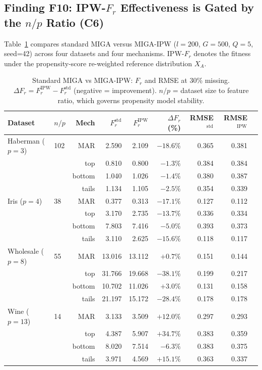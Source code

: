 \subsection{Finding F10: IPW-$F_r$ Effectiveness is Gated by the $n/p$ Ratio (C6)}

Table~\ref{tab:ipw} compares standard MIGA versus MIGA-IPW ($l=200$, $G=500$, $Q=5$, seed=42) across four datasets and four mechanisms. IPW-$F_r$ denotes the fitness under the propensity-score re-weighted reference distribution $X_A$.

\begin{table}[h]
\caption{Standard MIGA vs MIGA-IPW: $F_r$ and RMSE at 30\% missing. $\Delta F_r = F_r^{\text{IPW}} - F_r^{\text{std}}$ (negative = improvement). $n/p$ = dataset size to feature ratio, which governs propensity model stability.}
\label{tab:ipw}
\centering
\begin{tabular}{llrrrrrrr}
\toprule
\textbf{Dataset} & $n/p$ & \textbf{Mech} & $F_r^{\text{std}}$ & $F_r^{\text{IPW}}$ & $\Delta F_r$ (\%) & RMSE$^{\text{std}}$ & RMSE$^{\text{IPW}}$ \\
\midrule
Haberman ($p=3$) & 102 & MAR    & 2.590 & 2.109 & $-18.6\%$ & 0.365 & 0.381 \\
                 &     & top    & 0.810 & 0.800 & $-1.3\%$  & 0.384 & 0.384 \\
                 &     & bottom & 1.040 & 1.026 & $-1.4\%$  & 0.380 & 0.387 \\
                 &     & tails  & 1.134 & 1.105 & $-2.5\%$  & 0.354 & 0.339 \\
\midrule
Iris ($p=4$)     &  38 & MAR    & 0.377 & 0.313 & $-17.1\%$ & 0.127 & 0.112 \\
                 &     & top    & 3.170 & 2.735 & $-13.7\%$ & 0.336 & 0.334 \\
                 &     & bottom & 7.803 & 7.416 & $-5.0\%$  & 0.393 & 0.373 \\
                 &     & tails  & 3.110 & 2.625 & $-15.6\%$ & 0.118 & 0.117 \\
\midrule
Wholesale ($p=8$)&  55 & MAR    & 13.016 & 13.112 & $+0.7\%$  & 0.151 & 0.144 \\
                 &     & top    & 31.766 & 19.668 & $-38.1\%$ & 0.199 & 0.217 \\
                 &     & bottom & 10.702 & 11.026 & $+3.0\%$  & 0.131 & 0.158 \\
                 &     & tails  & 21.197 & 15.172 & $-28.4\%$ & 0.178 & 0.178 \\
\midrule
Wine ($p=13$)    &  14 & MAR    & 3.133 & 3.509 & $+12.0\%$ & 0.297 & 0.293 \\
                 &     & top    & 4.387 & 5.907 & $+34.7\%$ & 0.383 & 0.359 \\
                 &     & bottom & 8.020 & 7.514 & $-6.3\%$  & 0.383 & 0.375 \\
                 &     & tails  & 3.971 & 4.569 & $+15.1\%$ & 0.363 & 0.337 \\
\bottomrule
\end{tabular}
\end{table}

